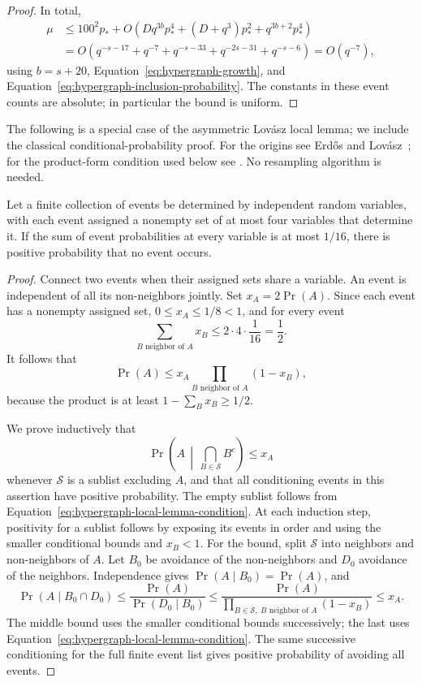 \begin{proof}
In total,
\begin{align*}
 \mu
 &\le 100^2p_*+
 O\left(Dq^{3b}p_*^4+(D+q^3)p_*^2+q^{3b+2}p_*^4\right)\\
 &=O\left(q^{-s-17}+q^{-7}+q^{-s-33}
                      +q^{-2s-31}+q^{-s-6}\right)
 =O(q^{-7}),
\end{align*}
using $b=s+20$, Equation~\eqref{eq:hypergraph-growth}, and
Equation~\eqref{eq:hypergraph-inclusion-probability}.  The constants
in these event counts are absolute; in particular the bound is uniform.
\end{proof}

The following is a special case of the asymmetric Lov\'asz local
lemma; we include the classical conditional-probability proof.
For the origins see Erd\H{o}s and Lov\'asz~\cite{ErdosLovasz1975};
for the product-form condition used below see
\cite[Theorem~1.1]{MoserTardos2009}. No resampling algorithm is needed.

\begin{lemma}\label{lem:hypergraph-local-lemma}
Let a finite collection of events be determined by independent
random variables, with each event assigned a nonempty set of at most
four variables that determine it.
If the sum of event probabilities at every variable is at most
$1/16$, there is positive probability that no event occurs.
\end{lemma}

\begin{proof}
Connect two events when their assigned sets share a variable.  An event
is independent of all its non-neighbors jointly.  Set $x_A=2\Pr(A)$.
Since each event has a nonempty assigned set, $0\le x_A\le1/8<1$,
and for every event
\[
 \sum_{B\text{ neighbor of }A}x_B\le 2\cdot4\cdot\frac1{16}
 =\frac12.
\]
It follows that
\begin{equation}\label{eq:hypergraph-local-lemma-condition}
 \Pr(A)\le x_A\prod_{B\text{ neighbor of }A}(1-x_B),
\end{equation}
because the product is at least $1-\sum_Bx_B\ge1/2$.

We prove inductively that
\[
 \Pr\left(A\,\middle|\,\bigcap_{B\in\mathcal S}B^c\right)\le x_A
\]
whenever $\mathcal S$ is a sublist excluding $A$, and that all
conditioning events in this assertion have positive probability.
The empty sublist follows from
Equation~\eqref{eq:hypergraph-local-lemma-condition}.
At each induction step, positivity for a sublist follows by exposing
its events in order and using the smaller conditional bounds and
$x_B<1$.  For the bound, split $\mathcal S$ into neighbors and
non-neighbors of $A$.  Let $B_0$ be avoidance of the non-neighbors
and $D_0$ avoidance of the neighbors.  Independence gives
$\Pr(A\mid B_0)=\Pr(A)$, and
\[
 \Pr(A\mid B_0\cap D_0)
 \le \frac{\Pr(A)}{\Pr(D_0\mid B_0)}
 \le \frac{\Pr(A)}
 {\prod_{B\in\mathcal S,\ B\text{ neighbor of }A}(1-x_B)}
 \le x_A.
\]
The middle bound uses the smaller conditional bounds successively;
the last uses Equation~\eqref{eq:hypergraph-local-lemma-condition}.
The same successive conditioning for the full finite event list
gives positive probability of avoiding all events.
\end{proof}

